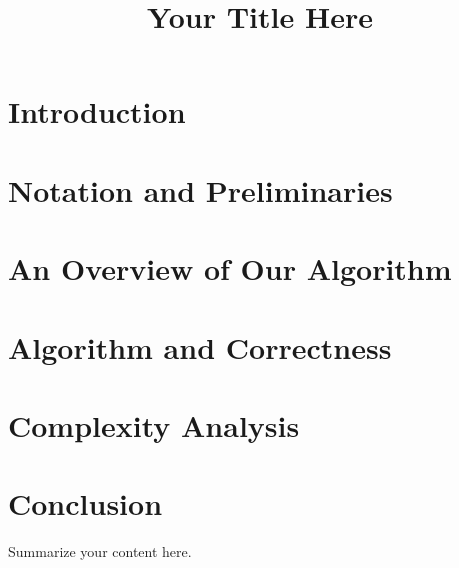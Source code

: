 \documentclass[11pt,letterpaper]{article}
\title{Your Title Here}
\date{}
\begin{document}
\maketitle

\section{Introduction}


\section{Notation and Preliminaries}


\section{An Overview of Our Algorithm}


\section{Algorithm and Correctness}


\section{Complexity Analysis}




\section{Conclusion}

Summarize your content here.
\end{document}
